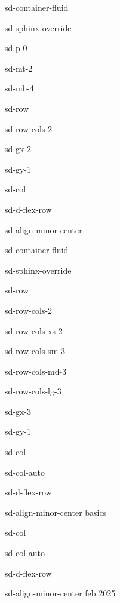 \documentclass[letterpaper,10pt,italian]{jupyterBook}
\begin{document}
\sphinxstepscope

\begin{sphinxuseclass}{sd-container-fluid}
\begin{sphinxuseclass}{sd-sphinx-override}
\begin{sphinxuseclass}{sd-p-0}
\begin{sphinxuseclass}{sd-mt-2}
\begin{sphinxuseclass}{sd-mb-4}
\begin{sphinxuseclass}{sd-row}
\begin{sphinxuseclass}{sd-row-cols-2}
\begin{sphinxuseclass}{sd-gx-2}
\begin{sphinxuseclass}{sd-gy-1}
\begin{sphinxuseclass}{sd-col}
\begin{sphinxuseclass}{sd-d-flex-row}
\begin{sphinxuseclass}{sd-align-minor-center}
\begin{sphinxuseclass}{sd-container-fluid}
\begin{sphinxuseclass}{sd-sphinx-override}
\begin{sphinxuseclass}{sd-row}
\begin{sphinxuseclass}{sd-row-cols-2}
\begin{sphinxuseclass}{sd-row-cols-xs-2}
\begin{sphinxuseclass}{sd-row-cols-sm-3}
\begin{sphinxuseclass}{sd-row-cols-md-3}
\begin{sphinxuseclass}{sd-row-cols-lg-3}
\begin{sphinxuseclass}{sd-gx-3}
\begin{sphinxuseclass}{sd-gy-1}
\begin{sphinxuseclass}{sd-col}
\begin{sphinxuseclass}{sd-col-auto}
\begin{sphinxuseclass}{sd-d-flex-row}
\begin{sphinxuseclass}{sd-align-minor-center}
\sphinxAtStartPar
basics

\end{sphinxuseclass}
\end{sphinxuseclass}
\end{sphinxuseclass}
\end{sphinxuseclass}
\begin{sphinxuseclass}{sd-col}
\begin{sphinxuseclass}{sd-col-auto}
\begin{sphinxuseclass}{sd-d-flex-row}
\begin{sphinxuseclass}{sd-align-minor-center}
 feb 2025


\end{sphinxuseclass}
\end{sphinxuseclass}
\end{sphinxuseclass}
\end{sphinxuseclass}
\end{sphinxuseclass}
\end{sphinxuseclass}
\end{sphinxuseclass}
\end{sphinxuseclass}
\end{sphinxuseclass}
\end{sphinxuseclass}
\end{sphinxuseclass}
\end{sphinxuseclass}
\end{sphinxuseclass}
\end{sphinxuseclass}
\end{sphinxuseclass}
\end{sphinxuseclass}
\end{sphinxuseclass}
\end{sphinxuseclass}
\end{sphinxuseclass}
\end{sphinxuseclass}
\end{sphinxuseclass}
\end{sphinxuseclass}
\end{sphinxuseclass}
\end{sphinxuseclass}
\end{sphinxuseclass}
\end{sphinxuseclass}
\end{document}
